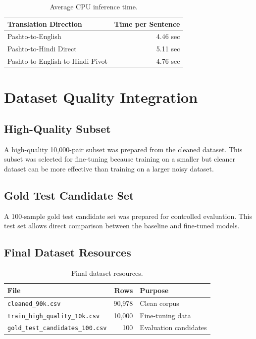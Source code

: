\documentclass[conference]{IEEEtran}
\begin{document}
\begin{table}[H]
\centering
\caption{Average CPU inference time.}
\begin{tabular}{lr}
\toprule
\textbf{Translation Direction} &
\textbf{Time per Sentence} \\
\midrule
Pashto-to-English & 4.46 sec \\
Pashto-to-Hindi Direct & 5.11 sec \\
Pashto-to-English-to-Hindi Pivot & 4.76 sec \\
\bottomrule
\end{tabular}
\end{table}

\section{Dataset Quality Integration}

\subsection{High-Quality Subset}

A high-quality 10,000-pair subset was prepared from the cleaned dataset. This subset was selected for fine-tuning because training on a smaller but cleaner dataset can be more effective than training on a larger noisy dataset.

\subsection{Gold Test Candidate Set}

A 100-sample gold test candidate set was prepared for controlled evaluation. This test set allows direct comparison between the baseline and fine-tuned models.

\subsection{Final Dataset Resources}

\begin{table}[H]
\centering
\caption{Final dataset resources.}
\begin{tabular}{lrl}
\toprule
\textbf{File} & \textbf{Rows} & \textbf{Purpose} \\
\midrule
\texttt{cleaned\_90k.csv} & 90,978 & Clean corpus \\
\texttt{train\_high\_quality\_10k.csv} & 10,000 & Fine-tuning data \\
\texttt{gold\_test\_candidates\_100.csv} & 100 & Evaluation candidates \\
\bottomrule
\end{tabular}
\end{table}
\end{document}
